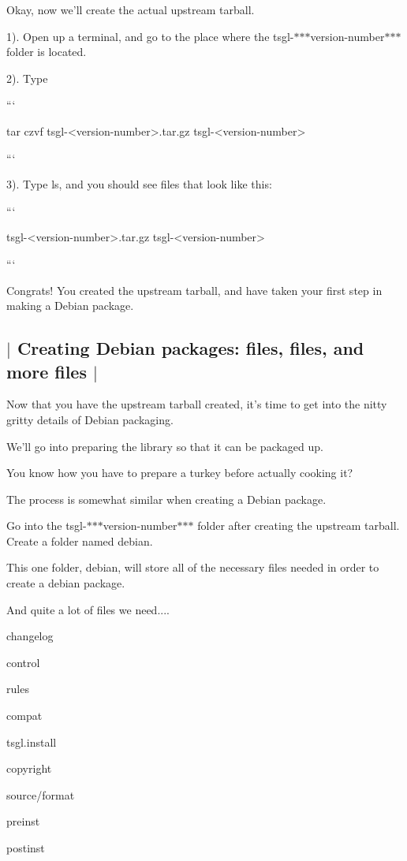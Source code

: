 Okay, now we'll create the actual upstream tarball.

1). Open up a terminal, and go to the place where the tsgl-\/$\ast$$\ast$$\ast$version-\/number$\ast$$\ast$$\ast$ folder is located.

2). Type

``` \begin{DoxyVerb}tar czvf tsgl-<version-number>.tar.gz tsgl-<version-number>
\end{DoxyVerb}


```

3). Type {\ttfamily ls}, and you should see files that look like this\-:

``` \begin{DoxyVerb}tsgl-<version-number>.tar.gz tsgl-<version-number> 
\end{DoxyVerb}


```

Congrats! You created the upstream tarball, and have taken your first step in making a Debian package. 

 \subsection*{$\vert$ Creating Debian packages\-: files, files, and more files $\vert$ }

Now that you have the upstream tarball created, it's time to get into the nitty gritty details of Debian packaging.

We'll go into preparing the library so that it can be packaged up.

You know how you have to prepare a turkey before actually cooking it?

The process is somewhat similar when creating a Debian package.

Go into the tsgl-\/$\ast$$\ast$$\ast$version-\/number$\ast$$\ast$$\ast$ folder after creating the upstream tarball. Create a folder named {\ttfamily debian}.

This one folder, {\ttfamily debian}, will store all of the necessary files needed in order to create a {\ttfamily debian} package.

And quite a lot of files we need....


\begin{DoxyItemize}
\item changelog
\item control
\item rules
\item compat
\item tsgl.\-install
\item copyright
\item source/format
\item preinst
\item postinst
\end{DoxyItemize}

